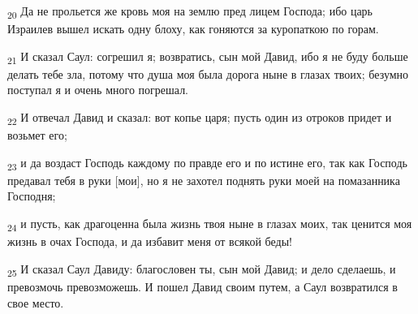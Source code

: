 \begin{tcolorbox}
\textsubscript{20} Да не прольется же кровь моя на землю пред лицем Господа; ибо царь Израилев вышел искать одну блоху, как гоняются за куропаткою по горам.
\end{tcolorbox}
\begin{tcolorbox}
\textsubscript{21} И сказал Саул: согрешил я; возвратись, сын мой Давид, ибо я не буду больше делать тебе зла, потому что душа моя была дорога ныне в глазах твоих; безумно поступал я и очень много погрешал.
\end{tcolorbox}
\begin{tcolorbox}
\textsubscript{22} И отвечал Давид и сказал: вот копье царя; пусть один из отроков придет и возьмет его;
\end{tcolorbox}
\begin{tcolorbox}
\textsubscript{23} и да воздаст Господь каждому по правде его и по истине его, так как Господь предавал тебя в руки [мои], но я не захотел поднять руки моей на помазанника Господня;
\end{tcolorbox}
\begin{tcolorbox}
\textsubscript{24} и пусть, как драгоценна была жизнь твоя ныне в глазах моих, так ценится моя жизнь в очах Господа, и да избавит меня от всякой беды!
\end{tcolorbox}
\begin{tcolorbox}
\textsubscript{25} И сказал Саул Давиду: благословен ты, сын мой Давид; и дело сделаешь, и превозмочь превозможешь. И пошел Давид своим путем, а Саул возвратился в свое место.
\end{tcolorbox}
